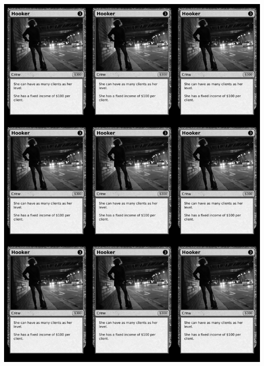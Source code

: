 \documentclass[a4paper]{article}
\begin{document}
\begin{center}
	\centering
	\includegraphics[width=190.5mm,height=266.7mm]{output/temp/page16.png}
\end{center}
\end{document}
